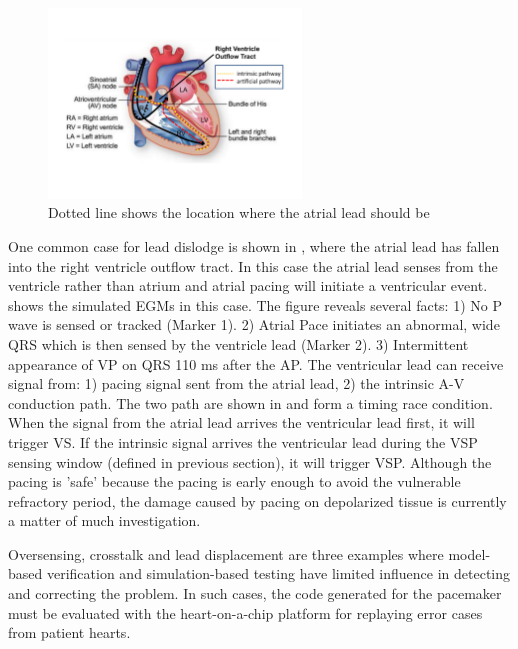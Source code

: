  \begin{figure}
\center
\includegraphics[width=0.60\textwidth]{figs/race_cond.pdf}
\caption{Dotted line shows the location where the atrial lead should be}
\label{fig:race_cond}
\end{figure}

One common case for lead dislodge is shown in , where the atrial lead has fallen into the right ventricle outflow tract. In this case the atrial lead senses from the ventricle rather than atrium and atrial pacing will initiate a ventricular event.  shows the simulated EGMs in this case. The figure reveals several facts: 1) No P wave is sensed or tracked (Marker 1). 2) Atrial Pace initiates an abnormal, wide QRS which is then sensed by the ventricle lead (Marker 2). 3) Intermittent appearance of VP on QRS 110 ms after the AP. The ventricular lead can receive signal from: 1) pacing signal sent from the atrial lead, 2) the intrinsic A-V conduction path. The two path are shown in  and form a timing race condition. When the signal from the atrial lead arrives the ventricular lead first, it will trigger VS. If the intrinsic signal arrives the ventricular lead during the VSP sensing window (defined in previous section), it will trigger VSP. Although the pacing is 'safe' because the pacing is early enough to avoid the vulnerable refractory period, the damage caused by pacing on depolarized tissue is currently a matter of much investigation. 

Oversensing, crosstalk and lead displacement are three examples where model-based verification and simulation-based testing have limited influence in detecting and correcting the problem. In such cases, the code generated for the pacemaker must be evaluated with the heart-on-a-chip platform for replaying error cases from patient hearts.

